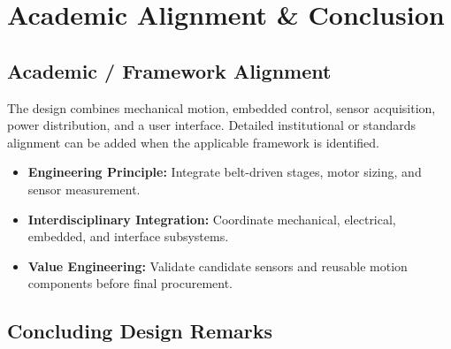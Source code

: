 
\section{Academic Alignment \& Conclusion}

\subsection{Academic / Framework Alignment}

The design combines mechanical motion, embedded control, sensor acquisition,
power distribution, and a user interface. Detailed institutional or standards
alignment can be added when the applicable framework is identified.

\begin{itemize}
    \item \textbf{Engineering Principle:} Integrate belt-driven stages, motor sizing, and sensor measurement.
    \item \textbf{Interdisciplinary Integration:} Coordinate mechanical, electrical, embedded, and interface subsystems.
    \item \textbf{Value Engineering:} Validate candidate sensors and reusable motion components before final procurement.
\end{itemize}

\subsection{Concluding Design Remarks}

\newpage
